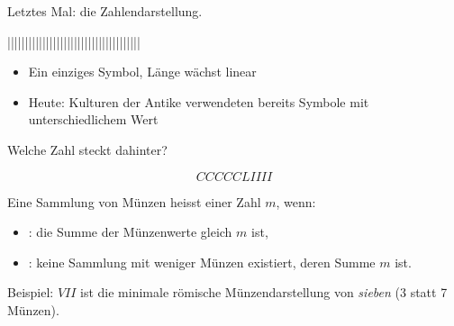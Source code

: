 \renewcommand{\thelektion}{L02 \textperiodcentered{} Basisgrössen \& Stellenwertdarstellung}

\begin{frame}\end{frame}

\begin{frame}
Letztes Mal: die  Zahlendarstellung.
\vspace{3mm}
\begin{center}
||||||||||||||||||||||||||||||||||||||
\end{center}
\begin{itemize}\setlength\itemsep{5pt}
  \item Ein einziges Symbol, Länge wächst linear
  \item Heute: Kulturen der Antike verwendeten bereits  Symbole mit unterschiedlichem Wert
\end{itemize}
\end{frame}

{
\begin{frame}
\end{frame}}

\begin{frame}
\begin{center}
Welche Zahl steckt dahinter?
\end{center}
\begin{equation*}
	CCCCCLIIII
\end{equation*}
\end{frame}

\begin{frame}
Eine Sammlung von Münzen heisst  einer Zahl $m$, wenn:
\begin{itemize}\setlength\itemsep{6pt}
  \item {}: die Summe der Münzenwerte gleich $m$ ist,
  \item {}: keine Sammlung mit weniger Münzen existiert, deren Summe $m$ ist.
\end{itemize}
\vspace{3mm}
\begin{center}
Beispiel: $VII$ ist die minimale römische Münzendarstellung von \textit{sieben} (3 statt 7 Münzen).
\end{center}
\end{frame}


